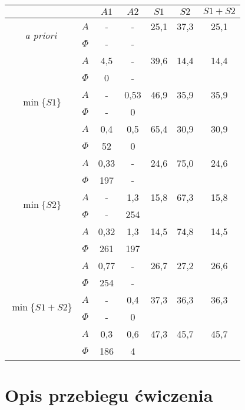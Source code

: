 \documentclass[polish,a4paper,11pt]{mwart}
\let\Oldsection\section
\renewcommand{\section}{\FloatBarrier\Oldsection}
\begin{document}
  \begin{table}[!tbh]
    \centering
    \begin{tabular}{|c|c|c|c|c|c|c|}
      \cline{3-7}
      \multicolumn{2}{c|}{}&$A1$&$A2$&$S1$&$S2$&$S1+S2$\\\hline
      \multirow{2}{*}{\textit{a priori}} & $A$ & - & - & 25,1 & 37,3 & 25,1\\\cline{2-7}
					 & $\Phi$ & - & - & \multicolumn{3}{c}{}\\\hline
      \multirow{6}{*}{$\min\{S1\}$}   &   $A$ & 4,5 & - & 39,6 & 14,4 & 14,4\\\cline{2-7}
				      &$\Phi$ & 0 & - & \multicolumn{3}{c}{}\\\cline{2-7}
				      &   $A$ & - & 0,53 & 46,9 & 35,9 & 35,9\\\cline{2-7}
				      &$\Phi$ & - & 0 & \multicolumn{3}{c}{}\\\cline{2-7}
				      &   $A$ & 0,4 & 0,5 & 65,4 & 30,9 & 30,9\\\cline{2-7}
				      &$\Phi$ & 52 & 0 & \multicolumn{3}{c}{}\\\hline
      \multirow{6}{*}{$\min\{S2\}$}   &   $A$ & 0,33 & - & 24,6 & 75,0 & 24,6\\\cline{2-7}
				      &$\Phi$ & 197 & - & \multicolumn{3}{c}{}\\\cline{2-7}
				      &   $A$ & - & 1,3 & 15,8 & 67,3 & 15,8\\\cline{2-7}
				      &$\Phi$ & - & 254 & \multicolumn{3}{c}{}\\\cline{2-7}
				      &   $A$ & 0,32 & 1,3 & 14,5 & 74,8 & 14,5\\\cline{2-7}
				      &$\Phi$ & 261 & 197 & \multicolumn{3}{c}{}\\\hline
      \multirow{6}{*}{$\min\{S1+S2\}$}&   $A$ & 0,77 & - & 26,7 & 27,2 & 26,6\\\cline{2-7}
				      &$\Phi$ & 254 & - & \multicolumn{3}{c}{}\\\cline{2-7}
				      &   $A$ & - & 0,4 & 37,3 & 36,3 & 36,3\\\cline{2-7}
				      &$\Phi$ & - & 0 & \multicolumn{3}{c}{}\\\cline{2-7}
				      &   $A$ & 0,3 & 0,6 & 47,3 & 45,7 & 45,7\\\cline{2-7}
				      &$\Phi$ & 186 & 4 & \multicolumn{3}{c}{}\\\cline{1-4}
    \end{tabular}
  \end{table}
  \section{Opis przebiegu ćwiczenia}
\end{document}
